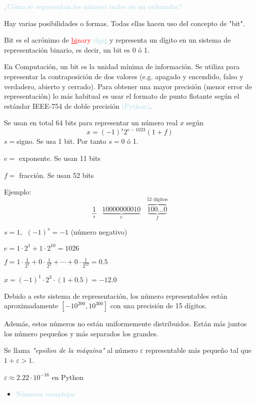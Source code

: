 \documentclass[12pt]{article}
\begin{document}
\textcolor{lightblue}{¿Cómo se representan los número reales en
un ordenador?}

Hay varias posibilidades o formas. Todas ellas hacen uso del
concepto de "bit".

Bit es el acrónimo de \textcolor{red}{\underline{bi}nary}
\textcolor{lightblue}{digi\underline{t}} y representa un dígito
en un sistema de representación binario, es decir, un bit es 0 ó
1.

En Computación, un bit es la unidad mínima de información. Se
utiliza para representar la contraposición de dos valores (e.g.
apagado y encendido, falso y verdadero, abierto y cerrado). Para
obtener una mayor precisión (menor error de representación) lo
más habitual es usar el formato de punto flotante según el
estándar IEEE-754 de doble precisión
\textcolor{lightblue}{(Python)}.

Se usan en total 64 bits para representar un número real $x$
según $$x=(-1)^s2^{e-1023}(1+f)$$ $s=$signo. Se usa 1 bit. Por
tanto $s=$0 ó 1.

$e=$ exponente. Se usan 11 bits

$f=$ fracción. Se usan 52 bits

Ejemplo:
$$\underbrace{1}_s~~~~\underbrace{10000000010}_e~~~~\overbrace{{\underbrace{100\hdots0}_f}}^{52
\text{ dígitos}}$$

$s=1,~~(-1)^s=-1$ (número negativo)

$e=1\cdot2^1+1\cdot2^10=1026$

$f=1\cdot\frac{1}{2^1}+0\cdot\frac{1}{2^2}+\cdots+0\cdot\frac{1}{2^{52}}=0.5$

$x=(-1)^1\cdot2^3\cdot(1+0.5)=-12.0$

Debido a este sistema de representación, los número
representables están aproximadamente $[-10^{200},10^{300}]$ con
una precisión de 15 dígitos.

Además, estos números no están uniformemente distribuidos. Están
más juntos los número pequeños y más separados los grandes.

Se llama \textit{"epsilon de la máquina"} al número
$\varepsilon$ representable más pequeño tal que
$1+\varepsilon>1$.

$\varepsilon\approx2.22\cdot10^{-16}$ en Python

\begin{itemize}[label=\color{red}\textbullet, leftmargin=*]
    \item \textcolor{lightblue}{Números complejos}
\end{itemize}
\end{document}

